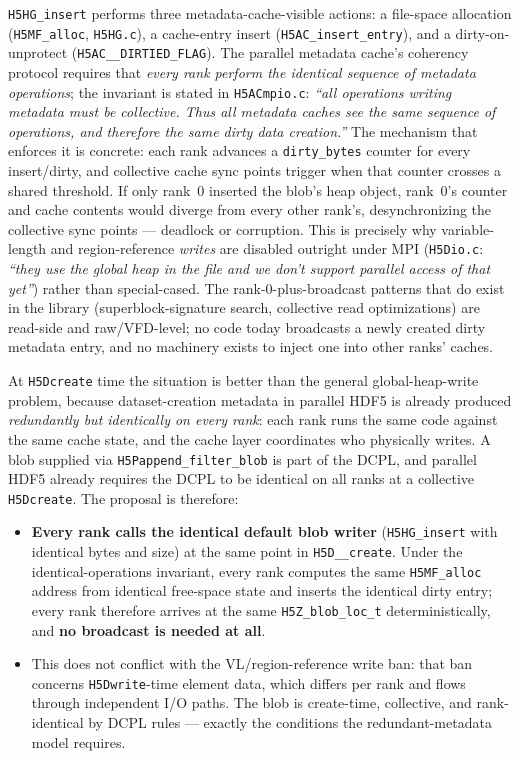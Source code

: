 \documentclass[../RFC-HDFG-2026-003.tex]{subfiles}
\begin{document}
\texttt{H5HG\_insert} performs three metadata-cache-visible actions:
a file-space allocation (\texttt{H5MF\_alloc}, \texttt{H5HG.c}), a
cache-entry insert (\texttt{H5AC\_insert\_entry}), and a
dirty-on-unprotect (\texttt{H5AC\_\_DIRTIED\_FLAG}). The parallel
metadata cache's coherency protocol requires that \emph{every rank
perform the identical sequence of metadata operations}; the invariant
is stated in \texttt{H5ACmpio.c}: \emph{``all operations writing
metadata must be collective. Thus all metadata caches see the same
sequence of operations, and therefore the same dirty data creation.''}
The mechanism that enforces it is concrete: each rank advances a
\texttt{dirty\_bytes} counter for every insert/dirty, and collective
cache sync points trigger when that counter crosses a shared threshold.
If only rank~0 inserted the blob's heap object, rank~0's counter and
cache contents would diverge from every other rank's, desynchronizing
the collective sync points --- deadlock or corruption. This is
precisely why variable-length and region-reference \emph{writes} are
disabled outright under MPI (\texttt{H5Dio.c}: \emph{``they use the
global heap in the file and we don't support parallel access of that
yet''}) rather than special-cased. The rank-0-plus-broadcast patterns
that do exist in the library (superblock-signature search, collective
read optimizations) are read-side and raw/VFD-level; no code today
broadcasts a newly created dirty metadata entry, and no machinery
exists to inject one into other ranks' caches.


At \texttt{H5Dcreate} time the situation is better than the general
global-heap-write problem, because dataset-creation metadata in
parallel HDF5 is already produced \emph{redundantly but identically on
every rank}: each rank runs the same code against the same cache state,
and the cache layer coordinates who physically writes. A blob supplied
via \texttt{H5Pappend\_filter\_blob} is part of the DCPL, and parallel
HDF5 already requires the DCPL to be identical on all ranks at a
collective \texttt{H5Dcreate}. The proposal is therefore:

\begin{itemize}
\item \textbf{Every rank calls the identical default blob writer}
  (\texttt{H5HG\_insert} with identical bytes and size) at the same
  point in \texttt{H5D\_\_create}. Under the identical-operations
  invariant, every rank computes the same \texttt{H5MF\_alloc} address
  from identical free-space state and inserts the identical dirty
  entry; every rank therefore arrives at the same
  \texttt{H5Z\_blob\_loc\_t} deterministically, and \textbf{no broadcast
  is needed at all}.
\item This does not conflict with the VL/region-reference write ban:
  that ban concerns \texttt{H5Dwrite}-time element data, which differs
  per rank and flows through independent I/O paths. The blob is
  create-time, collective, and rank-identical by DCPL rules --- exactly
  the conditions the redundant-metadata model requires.
\end{itemize}
\end{document}
